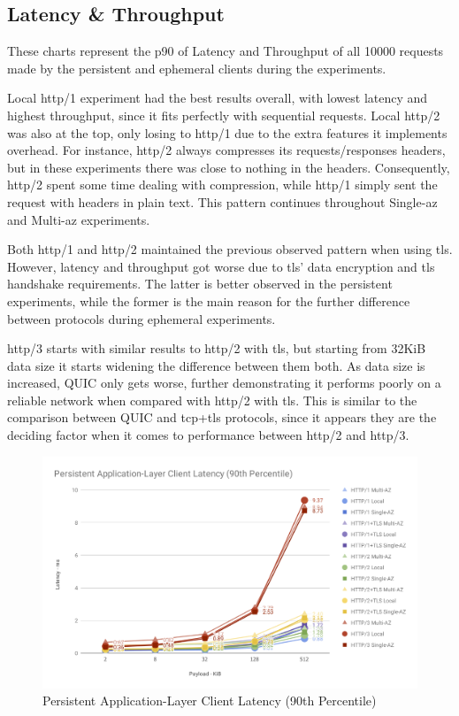 \subsection{Latency \& Throughput}

These charts represent the \gls{p90} of Latency and Throughput of all 10000 requests made by the persistent and ephemeral clients during the experiments.

Local \gls{http}/1 experiment had the best results overall, with lowest latency and highest throughput, since it fits perfectly with sequential requests. Local \gls{http}/2 was also at the top, only losing to \gls{http}/1 due to the extra features it implements overhead. For instance, \gls{http}/2 always compresses its requests/responses headers, but in these experiments there was close to nothing in the headers. Consequently, \gls{http}/2 spent some time dealing with compression, while \gls{http}/1 simply sent the request with headers in plain text. This pattern continues throughout Single-\gls{az} and Multi-\gls{az} experiments.

Both \gls{http}/1 and \gls{http}/2 maintained the previous observed pattern when using \gls{tls}. However, latency and throughput got worse due to \gls{tls}’ data encryption and \gls{tls} handshake requirements. The latter is better observed in the persistent experiments, while the former is the main reason for the further difference between protocols during ephemeral experiments.

\gls{http}/3 starts with similar results to \gls{http}/2 with \gls{tls}, but starting from 32KiB data size it starts widening the difference between them both. As data size is increased, QUIC only gets worse, further demonstrating it performs poorly on a reliable network when compared with \gls{http}/2 with \gls{tls}. This is similar to the comparison between QUIC and \gls{tcp}+\gls{tls} protocols, since it appears they are the deciding factor when it comes to performance between \gls{http}/2 and \gls{http}/3.

\clearpage

\begin{figure}[h!]
    \centering
    \includegraphics[width=\linewidth]{figures/charts/Persistent Application-Layer Client Latency (90th Percentile).png}
    \caption{Persistent Application-Layer Client Latency (90th Percentile)}
    \label{fig:persistent_app_latency}
\end{figure}


